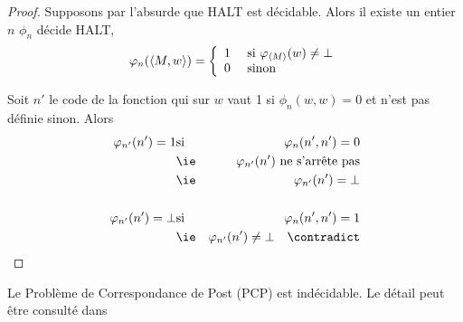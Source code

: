 \begin{proof}
	Supposons par l'absurde que HALT est décidable. Alors il existe un entier $n$ \tq $\phi_n$ décide HALT, \cad
	$$ \varphi_n(\left\langle M, w\right\rangle ) = \left\{ \begin{array}{ll}
			1 & \text{ si } \varphi_{\left\langle M\right\rangle}(w) \neq \bot \\
			0 & \text{ sinon}
		\end{array}
		\right.$$

	Soit $n'$ le code de la fonction qui sur $w$ vaut 1 si $\phi_n (w,w) = 0 $ et n'est pas définie sinon. Alors
	\begin{eqnarray*}
		\phi_{n'}(n') = 1 & \text{si} & \phi_n(n',n') = 0\\
		&\text{\ie}& \phi_{n'}(n') \text{ ne s'arrête pas} \\
		&\text{\ie}& \phi_{n'}(n') = \bot\\\\
		\phi_{n'}(n') = \bot & \text{si} & \phi_n(n',n') = 1\\
		&\text{\ie}& \phi_{n'}(n') \neq \bot \quad \contradict
	\end{eqnarray*}
\end{proof}

\begin{exemple}
	Le Problème de Correspondance de Post (PCP) est indécidable. Le détail peut être consulté dans \cite[Chapter~5.2]{sipser}
\end{exemple}

